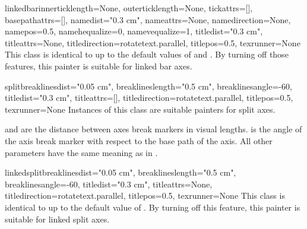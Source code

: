 \begin{classdesc}{linkedbar}{innerticklength=None,
                             outerticklength=None,
                             tickattrs=[],
                             basepathattrs=[],
                             namedist="0.3 cm",
                             nameattrs=None,
                             namedirection=None,
                             namepos=0.5,
                             namehequalize=0,
                             namevequalize=1,
                             titledist="0.3 cm",
                             titleattrs=None,
                             titledirection=rotatetext.parallel,
                             titlepos=0.5,
                             texrunner=None}
  This class is identical to  up to the default values of
   and . By turning off those features,
  this painter is suitable for linked bar axes.
\end{classdesc}

\begin{classdesc}{split}{breaklinesdist="0.05 cm",
                         breaklineslength="0.5 cm",
                         breaklinesangle=-60,
                         titledist="0.3 cm",
                         titleattrs=[],
                         titledirection=rotatetext.parallel,
                         titlepos=0.5,
                         texrunner=None}
  Instances of this class are suitable painters for split axes.

   and  are the distance
  between axes break markers in visual \PyX{} lengths.
   is the angle of the axis break marker with
  respect to the base path of the axis. All other parameters have the
  same meaning as in .
\end{classdesc}

\begin{classdesc}{linkedsplit}{breaklinesdist="0.05 cm",
                               breaklineslength="0.5 cm",
                               breaklinesangle=-60,
                               titledist="0.3 cm",
                               titleattrs=None,
                               titledirection=rotatetext.parallel,
                               titlepos=0.5,
                               texrunner=None}
  This class is identical to  up to the default value of
  . By turning off this feature, this painter is
  suitable for linked split axes.
\end{classdesc} %

